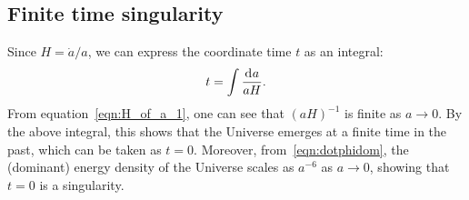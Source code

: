 \subsection{Finite time singularity}

Since $H = \dot{a}/a$, we can express the coordinate time $t$ as an integral: 
%
\begin{equation}
  t = \int \frac{\operatorname{d}^{}\!{a}}{aH}.
\end{equation}
%
From equation~\eqref{eqn:H_of_a_1}, one can see that ${(aH)}^{-1}$ is finite as $a\to0$. By the above integral, this shows that the Universe emerges at a finite time in the past, which can be taken as $t=0$.  Moreover, from~\eqref{eqn:dotphidom}, the (dominant) energy density of the Universe scales as $a^{-6}$ as $a \to 0$, showing that $t=0$ is a singularity.

